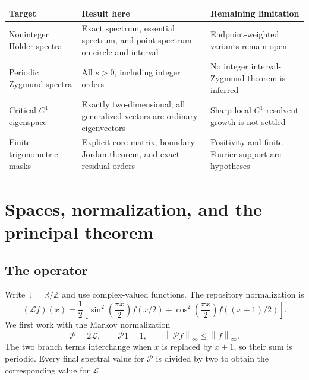 \documentclass[11pt,a4paper]{article}
\numberwithin{equation}{section}
\theoremstyle{definition}
\theoremstyle{remark}
\newcommand{\R}{\mathbb R}
\newcommand{\Z}{\mathbb Z}
\newcommand{\T}{\mathbb T}
\newcommand{\Pp}{\mathcal P}
\newcommand{\Ll}{\mathcal L}
\newcommand{\norm}[1]{\left\lVert#1\right\rVert}
\begin{document}
\begin{center}
\small
\begin{tabularx}{\textwidth}{@{}p{}Y Y@{}}
\toprule
Target & Result here & Remaining limitation\\
\midrule
Noninteger H\"older spectra & Exact spectrum, essential spectrum, and point
spectrum on circle and interval & Endpoint-weighted variants remain open\\
Periodic Zygmund spectra & All $s>0$, including integer orders & No integer
interval-Zygmund theorem is inferred\\
Critical $C^1$ eigenspace & Exactly two-dimensional; all generalized vectors
are ordinary eigenvectors & Sharp local $C^1$ resolvent growth is not settled\\
Finite trigonometric masks & Explicit core matrix, boundary Jordan theorem,
and exact residual orders & Positivity and finite Fourier support are hypotheses\\
\bottomrule
\end{tabularx}
\end{center}

\section{Spaces, normalization, and the principal theorem}
\label{sec:main}

\subsection{The operator}
Write $\T=\R/\Z$ and use complex-valued functions. The repository
normalization is
\begin{equation}
 (\Ll f)(x)=\frac12\left[
 \sin^2\!\left(\frac{\pi x}{2}\right)f(x/2)
 +\cos^2\!\left(\frac{\pi x}{2}\right)f((x+1)/2)
 \right].
 \label{eq:L}
\end{equation}
We first work with the Markov normalization
\begin{equation}
 \Pp=2\Ll,\qquad \Pp1=1,\qquad
 \norm{\Pp f}_\infty\le\norm f_\infty.
 \label{eq:P}
\end{equation}
The two branch terms interchange when $x$ is replaced by $x+1$, so their
sum is periodic. Every final spectral value for $\Pp$ is divided by two
to obtain the corresponding value for $\Ll$.
\end{document}

